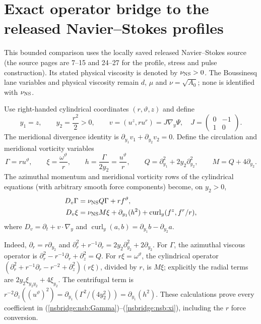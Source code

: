 \section{Exact operator bridge to the released Navier--Stokes profiles}
\label{nsbridge:nsb:operator}

This bounded comparison uses the locally saved released Navier--Stokes source
(the source pages are 7--15 and 24--27 for the profile, stress and pulse
construction). Its stated physical viscosity is denoted by $\nu_{\rm NS}>0$.
The Boussinesq lane variables and physical viscosity remain $d$, $\mu$ and
$\nu=\sqrt{A_0}$; none is identified with $\nu_{\rm NS}$.

Use right-handed cylindrical coordinates $(r,\vartheta,z)$ and define
\[
 y_1=z,\qquad y_2=\frac{r^2}{2}>0,\qquad
 v=(u^z,ru^r)=J\nabla_y\Psi,
 \quad J=\begin{pmatrix}0&-1\\1&0\end{pmatrix}.
\]
The meridional divergence identity is
$\partial_{y_1}v_1+\partial_{y_2}v_2=0$. Define the circulation and
meridional vorticity variables
\[
 \Gamma=ru^\vartheta,
 \qquad \xi=\frac{\omega^\vartheta}{r},
 \qquad h=\frac{\Gamma}{2y_2}=\frac{u^\vartheta}{r},
 \qquad Q=\partial_{y_1}^2+2y_2\partial_{y_2}^2,
 \qquad M=Q+4\partial_{y_2}.
\]
The azimuthal momentum and meridional vorticity rows of the cylindrical
equations (with arbitrary smooth force components) become, on $y_2>0$,
\begin{align}
 D_v\Gamma&=\nu_{\rm NS}Q\Gamma+r f^\vartheta,
 \label{nsbridge:nsb:Gamma}\\
 D_v\xi&=\nu_{\rm NS}M\xi+\partial_{y_1}(h^2)
       +\operatorname{curl}_y(f^z,f^r/r),
 \label{nsbridge:nsb:xi}
\end{align}
where $D_v=\partial_t+v\cdot\nabla_y$ and
$\operatorname{curl}_y(a,b)=\partial_{y_1}b-\partial_{y_2}a$.

Indeed, $\partial_r=r\partial_{y_2}$ and
$\partial_r^2+r^{-1}\partial_r=2y_2\partial_{y_2}^2+2\partial_{y_2}$.
For $\Gamma$, the azimuthal viscous operator is
$\partial_r^2-r^{-1}\partial_r+\partial_z^2=Q$.
For $r\xi=\omega^\vartheta$, the cylindrical operator
$(\partial_r^2+r^{-1}\partial_r-r^{-2}+\partial_z^2)(r\xi)$,
divided by $r$, is $M\xi$; explicitly the radial terms are
$2y_2\xi_{y_2y_2}+4\xi_{y_2}$. The centrifugal term is
$r^{-2}\partial_z((u^\vartheta)^2)=\partial_{y_1}(\Gamma^2/(4y_2^2))
=\partial_{y_1}(h^2)$. These calculations prove every coefficient in
(\ref{nsbridge:nsb:Gamma})--(\ref{nsbridge:nsb:xi}), including the $r$ force conversion.

